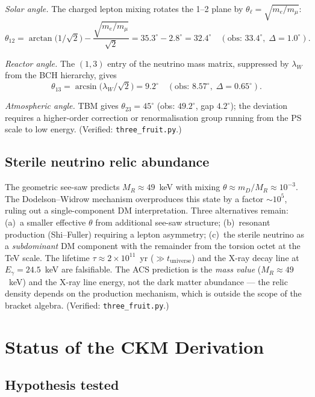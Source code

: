 \documentclass[11pt,a4paper]{article}
\theoremstyle{plain}
\theoremstyle{definition}
\theoremstyle{remark}
\begin{document}
\textit{Solar angle.}
The charged lepton mixing rotates the 1--2 plane by
$\theta_\ell = \sqrt{m_e/m_\mu}$:
\[
  \theta_{12} = \arctan\!\bigl(1/\!\sqrt{2}\bigr) - \frac{\sqrt{m_e/m_\mu}}{\sqrt{2}}
  = 35.3^\circ - 2.8^\circ = 32.4^\circ
  \quad(\text{obs: } 33.4^\circ,\; \Delta = 1.0^\circ).
\]

\textit{Reactor angle.}
The $(1,3)$ entry of the neutrino mass matrix, suppressed by
$\lambda_W$ from the BCH hierarchy, gives
\[
  \theta_{13} = \arcsin\!\bigl(\lambda_W/\!\sqrt{2}\bigr) = 9.2^\circ
  \quad(\text{obs: } 8.57^\circ,\; \Delta = 0.65^\circ).
\]

\textit{Atmospheric angle.}
TBM gives $\theta_{23} = 45^\circ$ (obs: $49.2^\circ$, gap $4.2^\circ$);
the deviation requires a higher-order correction or renormalisation
group running from the PS scale to low energy.
(Verified: \texttt{three\_fruit.py}.)

\subsection*{Sterile neutrino relic abundance}

The geometric see-saw predicts $M_R \approx 49$~keV with mixing
$\theta \approx m_D/M_R \approx 10^{-3}$.  The Dodelson--Widrow
mechanism overproduces this state by a factor $\sim\! 10^5$,
ruling out a single-component DM interpretation.  Three alternatives
remain: (a)~a smaller effective $\theta$ from additional see-saw
structure; (b)~resonant production (Shi--Fuller) requiring a lepton
asymmetry; (c)~the sterile neutrino as a \emph{subdominant} DM
component with the remainder from the torsion octet at the TeV scale.
The lifetime $\tau \approx 2 \times 10^{11}$~yr ($\gg t_{\mathrm{universe}}$)
and the X-ray decay line at $E_\gamma = 24.5$~keV are falsifiable.
The ACS prediction is the \emph{mass value} ($M_R \approx 49$~keV)
and the X-ray line energy, not the dark matter abundance ---
the relic density depends on the production mechanism, which is
outside the scope of the bracket algebra.
(Verified: \texttt{three\_fruit.py}.)

\clearpage
\section{Status of the CKM Derivation}
\label{app:ckm-status}

\subsection*{Hypothesis tested}
\end{document}
